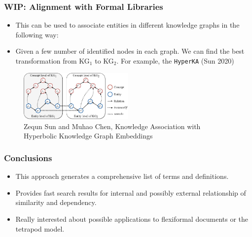 \documentclass[10pt]{beamer}
\begin{document}
\begin{frame}
    \frametitle{WIP: Alignment with Formal Libraries}
    \begin{itemize}
        \item This can be used to associate entities in different knowledge graphs in the following way:
            \pause
        \item Given a few number of identified nodes in each graph. We can find the best transformation from KG$_1$ to KG$_2$. For example, 
            the \texttt{HyperKA} (Sun 2020)
    \end{itemize}
            \begin{figure}
                \centering
                \includegraphics[width=0.5\textwidth]{../Images/example.png}
                \caption{Zequn Sun and Muhao Chen, Knowledge Association with Hyperbolic Knowledge Graph Embeddings}
            \end{figure}
\end{frame}



\begin{frame}
    \frametitle{Conclusions}
    \begin{itemize}
        \item This approach  generates a comprehensive list of terms and definitions.
        \item Provides fast search results for internal and possibly external relationship of similarity and dependency.
        \item Really interested about possible applications to flexiformal documents or the tetrapod model.
    \end{itemize}
\end{frame}

\begin{frame}
\titlepage
\end{frame}
\end{document}
